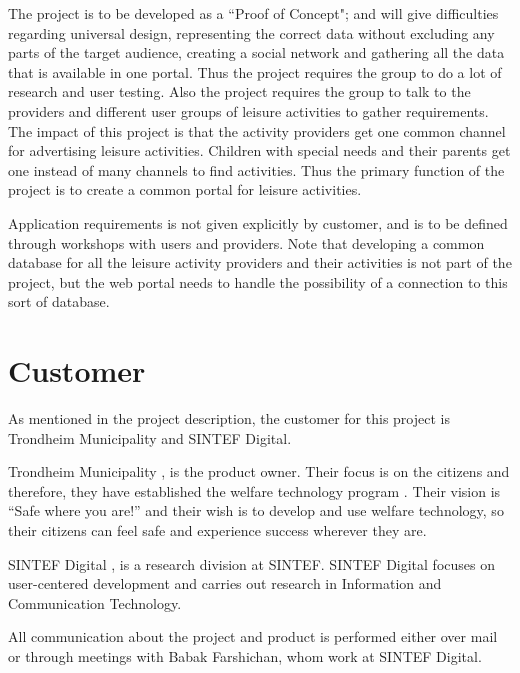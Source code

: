The project is to be developed as a “Proof of Concept"; and will give difficulties regarding universal design, representing the correct data without excluding any parts of the target audience, creating a social network and gathering all the data that is available in one portal. Thus the project requires the group to do a lot of research and user testing. Also the project requires the group to talk to the providers and different user groups of leisure activities to gather requirements. The impact of this project is that the activity providers get one common channel for advertising leisure activities. Children with special needs and their parents get one instead of many channels to find activities. Thus the primary function of the project is to create a common portal for leisure activities.

Application requirements is not given explicitly by customer, and is to be defined through workshops with users and providers. Note that developing a common database for all the leisure activity providers and their activities is not part of the project, but the web portal needs to handle the possibility of a connection to this sort of database.  

\section{Customer}
As mentioned in the project description, the customer for this project is Trondheim Municipality and SINTEF Digital.

Trondheim Municipality \cite{TrondheimMunicipality}, is the product owner. Their focus is on the citizens and therefore, they have established the welfare technology program \cite{WelfareProgram}. Their vision is “Safe where you are!” and their wish is to develop and use welfare technology, so their citizens can feel safe and experience success wherever they are.

SINTEF Digital \cite{SintefDigital}, is a research division at SINTEF. SINTEF Digital focuses on user-centered development and carries out research in Information and Communication Technology.

All communication about the project and product is performed either over mail or through meetings with Babak Farshichan, whom work at SINTEF Digital.


\cleardoublepage